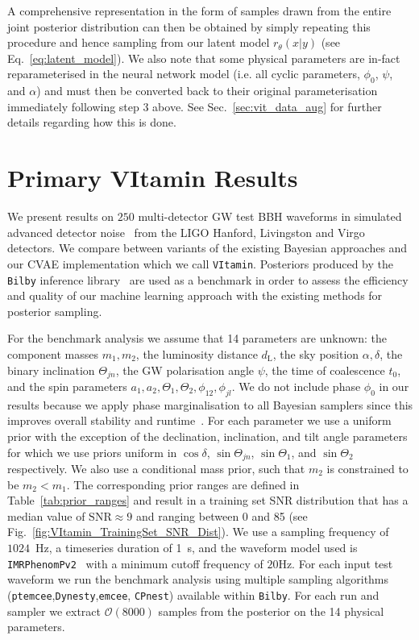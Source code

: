%
%
A comprehensive representation in the form of samples drawn from the 
entire joint posterior distribution can then be obtained by 
simply repeating this procedure and hence sampling from our 
latent model $r_{\theta}(x|y)$ (see Eq.~\ref{eq:latent_model}).
We also note that some physical parameters are in-fact reparameterised in the 
neural network model (i.e. all cyclic parameters, $\phi_0$, $\psi$, and  
$\alpha$) and must then be converted back to their original 
parameterisation immediately 
following step 3 above. See Sec.~\ref{sec:vit_data_aug} for further details 
regarding how this is done.

\section{Primary VItamin Results}
%
We present results on $250$ multi-detector \ac{GW} test 
\ac{BBH} waveforms in simulated advanced detector 
noise~\cite{aligo_noisecurves} from the LIGO Hanford, 
Livingston and Virgo detectors. We compare between
variants of the existing Bayesian approaches and our 
\ac{CVAE} implementation which we call \texttt{VItamin}. 
Posteriors produced by the \texttt{Bilby} inference 
library~\cite{1811.02042} are used as a benchmark in order to 
assess the efficiency and quality of our machine learning approach 
with the existing methods for posterior sampling.

%
%
For the benchmark analysis we assume that 14 parameters are
unknown: the component masses
$m_1,m_2$, the luminosity distance $d_{\text{L}}$, the sky position
$\alpha,\delta$, the binary inclination $\Theta_{jn}$, the \ac{GW} polarisation
angle ${\psi}$, the time of coalescence $t_{0}$, and the spin parameters $a_1,a_2,
\Theta_1,\Theta_2,\phi_{12},\phi_{jl}$.  We do not include phase $\phi_0$ in our 
results 
because we apply phase marginalisation to all Bayesian samplers since 
this 
improves overall stability and runtime~\cite{1811.02042}. For each parameter we use a uniform prior 
with the exception of the declination, inclination, and tilt angle 
parameters for 
which we use priors uniform in $\cos\delta$, $\sin\Theta_{jn}$, $\sin\Theta_1$, 
and $\sin\Theta_2$ respectively. We also use a conditional mass prior, 
such that $m_2$ is constrained to be $m_2 < m_1$. The corresponding 
prior ranges are defined in Table~\ref{tab:prior_ranges} and 
result in a training set \ac{SNR} distribution that has a median value of 
$\text{SNR}\approx 9$ and ranging between 0 and 
85 (see Fig.~\ref{fig:VItamin_TrainingSet_SNR_Dist}). We use a 
sampling frequency of $1024$~Hz, a timeseries duration of 1~s, and 
the waveform model used is \texttt{IMRPhenomPv2}~\cite{1809.10113} with 
a minimum cutoff frequency of $20$Hz. For each input test 
waveform we run the benchmark analysis using multiple 
sampling algorithms (\texttt{ptemcee},\texttt{Dynesty},\texttt{emcee},
\texttt{CPnest}) available within \texttt{Bilby}. For each run and 
sampler we extract $\mathcal{O}(8000)$ samples from the posterior on the 
14 physical parameters.

